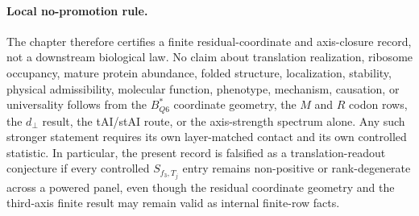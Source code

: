 \paragraph{Local no-promotion rule.}
The chapter therefore certifies a finite residual-coordinate and axis-closure record, not a downstream biological law.  No claim about translation realization, ribosome occupancy, mature protein abundance, folded structure, localization, stability, physical admissibility, molecular function, phenotype, mechanism, causation, or universality follows from the $B^*_{Q6}$ coordinate geometry, the $M$ and $R$ codon rows, the $d_{\perp}$ result, the tAI/stAI route, or the axis-strength spectrum alone.  Any such stronger statement requires its own layer-matched contact and its own controlled statistic.  In particular, the present record is falsified as a translation-readout conjecture if every controlled $S_{f_3,T_j}$ entry remains non-positive or rank-degenerate across a powered panel, even though the residual coordinate geometry and the third-axis finite result may remain valid as internal finite-row facts.